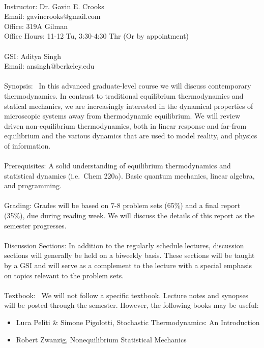 \documentclass[article,notes]{bespoke6}
\begin{document}
~\\
Instructor: Dr. Gavin E. Crooks \\
Email: gavincrooks@gmail.com \\
Office: 319A Gilman \\
Office Hours: 11-12 Tu, 3:30-4:30 Thr (Or by appointment)\\
~\\
GSI: Aditya Singh \\
Email: ansingh@berkeley.edu\\
~\\
Synopsis:~ In this advanced graduate-level course we will discuss contemporary thermodynamics. In contrast to traditional equilibrium thermodynamics and statical mechanics, we are increasingly interested in the dynamical properties of microscopic systems away from thermodynamic equilibrium. We will review driven non-equilibrium thermodynamics, both in linear response and far-from equilibrium and the various dynamics that are used to model reality, and physics of information.
\\~\\
Prerequisites: A solid understanding of equilibrium thermodynamics and statistical dynamics (i.e.~Chem 220a). Basic quantum mechanics, linear algebra, and programming.
\\~\\
Grading: Grades will be based on 7-8 problem sets (65\%) and a final report (35\%), due during reading week. We will discuss the details of this report as the semester progresses.
\\~\\
Discussion Sections: In addition to the regularly schedule lectures, discussion sections will generally be held on a biweekly basis. These sections will be taught by a GSI and will serve as a complement to the lecture with a special emphasis on topics relevant to the problem sets.
\\~\\
Textbook:~
We will not follow a specific textbook. Lecture notes and synopses will be posted through the semester.
However, the following books may be useful:
\begin{itemize}
  \item Luca Peliti \& Simone Pigolotti, Stochastic Thermodynamics: An Introduction \cite{Peliti2021a}
  \item Robert Zwanzig, Nonequilibrium Statistical Mechanics \cite{Zwanzig2001a}
\end{itemize}
~\\~\\
\end{document}
